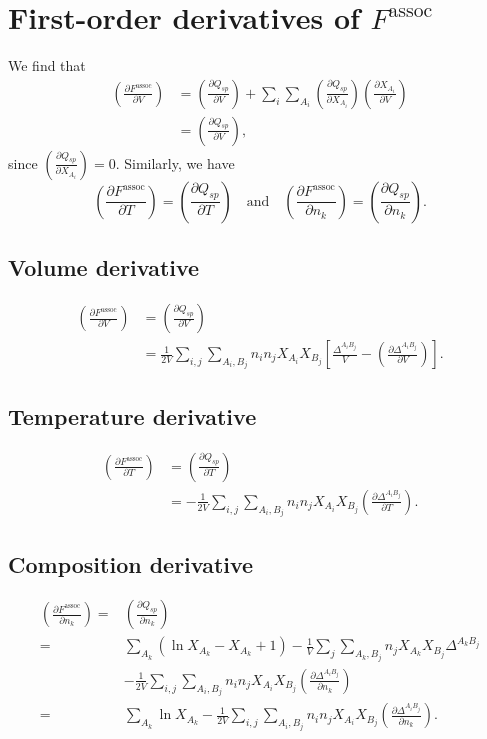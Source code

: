 \documentclass[english]{../thermomemo/thermomemo}
\newcommand*{\pder}[2]{\left(\frac{\partial #1}{\partial #2}\right)}
\newcommand{\lp}{\left(}
\newcommand{\rp}{\right)}
\begin{document}
\section{First-order derivatives of $F^{\text{assoc}}$} \label{first-order derivatives}
We find that
\begin{align*}
\pder{F^{\text{assoc}}}{V} &= \pder{Q_{sp}}{V}  + \sum_i \sum_{A_i} \pder{Q_{sp}}{X_{A_i}} \pder{X_{A_i}}{V} \\
& = \pder{Q_{sp}}{V},
\end{align*}
since $\pder{Q_{sp}}{X_{A_i}} = 0$. Similarly, we have
$$
\pder{F^{\text{assoc}}}{T} = \pder{Q_{sp}}{T} \quad \text{and} \quad \pder{F^{\text{assoc}}}{n_k} = \pder{Q_{sp}}{n_k}.
$$
\subsection{Volume derivative}
\begin{align}
  \pder{F^{\text{assoc}}}{V} &= \pder{Q_{sp}}{V} \\ \nonumber
  &= \frac{1}{2V} \sum_{i,j} \sum_{A_i, B_j} n_i n_j X_{A_i} X_{B_j} \left[ \frac{\Delta^{A_i B_j}}{V} - \pder{\Delta^{A_i B_j}}{V} \right].
\end{align}

\subsection{Temperature derivative}
\begin{align}
  \pder{F^{\text{assoc}}}{T} &= \pder{Q_{sp}}{T} \\ \nonumber
  &= -\frac{1}{2V} \sum_{i,j} \sum_{A_i, B_j} n_i n_j X_{A_i} X_{B_j} \pder{\Delta^{A_i B_j}}{T}.
\end{align}

\subsection{Composition derivative}
\begin{align}
  \pder{F^{\text{assoc}}}{n_k} =& \pder{Q_{sp}}{n_k} \nonumber \\ 
  =& \sum_{A_k} \lp \ln X_{A_k} - X_{A_k} + 1\rp - \frac{1}{V} \sum_{j} \sum_{A_k,B_j} n_j X_{A_k} X_{B_j} \Delta^{A_k B_j} \label{l1}\\
  &- \frac{1}{2V} \sum_{i,j} \sum_{A_i, B_j} n_i n_j X_{A_i} X_{B_j} \pder{\Delta^{A_i B_j}}{n_k} \label{l2}\\
  =& \sum_{A_k} \ln X_{A_k} - \frac{1}{2V} \sum_{i,j} \sum_{A_i, B_j} n_i n_j X_{A_i} X_{B_j} \pder{\Delta^{A_i B_j}}{n_k}. \label{nono}
\end{align}
\end{document}
